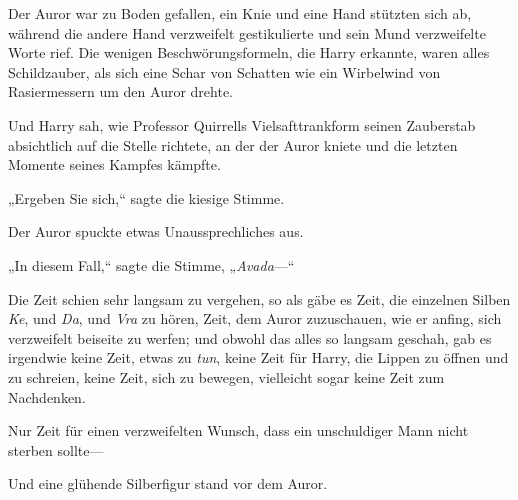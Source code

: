 Der Auror war zu Boden gefallen, ein Knie und eine Hand stützten sich ab, während die andere Hand verzweifelt gestikulierte und sein Mund verzweifelte Worte rief. Die wenigen Beschwörungsformeln, die Harry erkannte, waren alles Schildzauber, als sich eine Schar von Schatten wie ein Wirbelwind von Rasiermessern um den Auror drehte.

Und Harry sah, wie Professor Quirrells Vielsafttrankform seinen Zauberstab absichtlich auf die Stelle richtete, an der der Auror kniete und die letzten Momente seines Kampfes kämpfte.

„Ergeben Sie sich,“ sagte die kiesige Stimme.

Der Auror spuckte etwas Unaussprechliches aus.

„In diesem Fall,“ sagte die Stimme, „\emph{Avada}—“

Die Zeit schien sehr langsam zu vergehen, so als gäbe es Zeit, die einzelnen Silben \emph{Ke}, und \emph{Da}, und \emph{Vra} zu hören, Zeit, dem Auror zuzuschauen, wie er anfing, sich verzweifelt beiseite zu werfen; und obwohl das alles so langsam geschah, gab es irgendwie keine Zeit, etwas zu \emph{tun}, keine Zeit für Harry, die Lippen zu öffnen und  zu schreien, keine Zeit, sich zu bewegen, vielleicht sogar keine Zeit zum Nachdenken.

Nur Zeit für einen verzweifelten Wunsch, dass ein unschuldiger Mann nicht sterben sollte—

Und eine glühende Silberfigur stand vor dem Auror.

